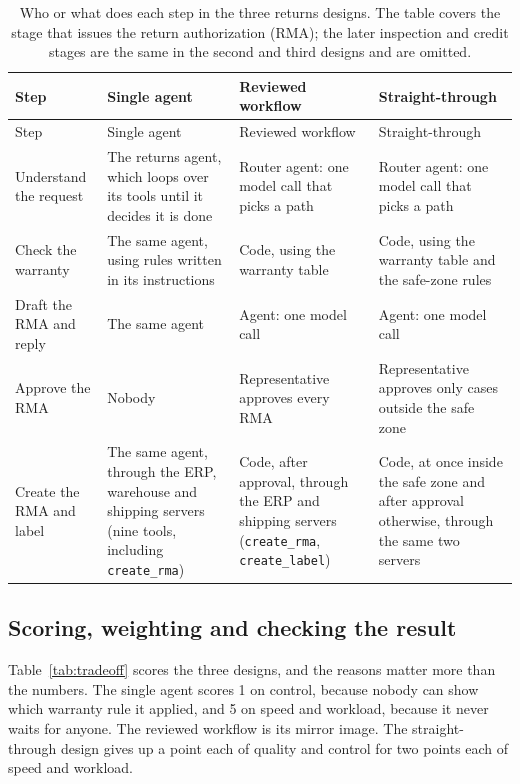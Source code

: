 \begingroup
\small
\begin{xltabular}{\textwidth}{@{}>{\raggedright\arraybackslash}p{2.4cm}>{\raggedright\arraybackslash}X>{\raggedright\arraybackslash}X>{\raggedright\arraybackslash}X@{}}
\caption{Who or what does each step in the three returns designs. The table covers the stage that issues the return authorization (RMA); the later inspection and credit stages are the same in the second and third designs and are omitted.}\label{tab:returns-designs}\\
\toprule
{} Step & Single agent & Reviewed workflow & Straight-through \\
\midrule
\endfirsthead
\toprule
{} Step & Single agent & Reviewed workflow & Straight-through \\
\midrule
\endhead
Understand the request & The returns agent, which loops over its tools until it decides it is done & Router agent: one model call that picks a path & Router agent: one model call that picks a path \\
Check the warranty & The same agent, using rules written in its instructions & Code, using the warranty table & Code, using the warranty table and the safe-zone rules \\
Draft the RMA and reply & The same agent & Agent: one model call & Agent: one model call \\
Approve the RMA & Nobody & Representative approves every RMA & Representative approves only cases outside the safe zone \\
Create the RMA and label & The same agent, through the ERP, warehouse and shipping servers (nine tools, including \texttt{create\_rma}) & Code, after approval, through the ERP and shipping servers (\texttt{create\_rma}, \texttt{create\_label}) & Code, at once inside the safe zone and after approval otherwise, through the same two servers \\
\bottomrule
\end{xltabular}
\endgroup

\subsection{Scoring, weighting and checking the result}

Table~\ref{tab:tradeoff} scores the three designs, and the reasons matter more than the numbers. The single agent scores 1 on control, because nobody can show which warranty rule it applied, and 5 on speed and workload, because it never waits for anyone. The reviewed workflow is its mirror image. The straight-through design gives up a point each of quality and control for two points each of speed and workload.

